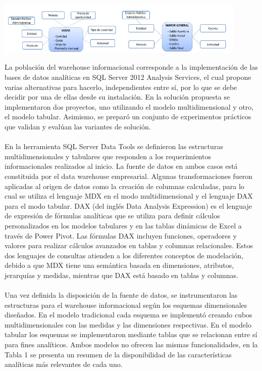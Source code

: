 \documentclass[preprint,12pt]{elsarticle}
\begin{document}
\begin{center}
	\includegraphics[width=12cm]{./Imagenes/ang3} 
\end{center}

La  población  del  warehouse  informacional  corresponde  a  la  implementación  de  las  bases  de  datos analíticas  en  SQL  Server  2012  Analysis  Services,  el  cual  propone  varias  alternativas  para  hacerlo, independientes entre sí, por lo que se debe decidir por una de ellas desde su instalación. En la solución propuesta se implementaron dos proyectos, uno utilizando el modelo multidimensional y otro, el modelo tabular. Asimismo, se preparó un conjunto de experimentos prácticos que validan y evalúan las variantes de solución.  \\ 
\\
En la herramienta SQL Server Data Tools se definieron las estructuras multidimensionales y tabulares que responden a los requerimientos informacionales realizados al inicio. La fuente de datos en ambos casos está constituida por el data warehouse empresarial. Algunas transformaciones fueron aplicadas al origen de datos como la creación de columnas calculadas, para lo cual se utiliza el lenguaje MDX en el modo multidimensional y el lenguaje DAX para el modo tabular. DAX (del inglés Data Analysis Expression) es el lenguaje de expresión de fórmulas analíticas que se utiliza para definir cálculos personalizados en los modelos  tabulares  y en  las  tablas  dinámicas de  Excel  a  través de  Power  Pivot.  Las  fórmulas  DAX incluyen  funciones,  operadores  y  valores  para  realizar  cálculos  avanzados  en  tablas  y  columnas relacionales. Estos dos lenguajes de consultas atienden a los diferentes conceptos de modelación, debido a que MDX tiene una semántica basada en dimensiones, atributos, jerarquías y medidas, mientras que DAX está basado en tablas y columnas.   \\
\\
Una vez definida la disposición de la fuente de datos, se instrumentaron las estructuras para el warehouse informacional según los esquemas dimensionales diseñados. En el modelo tradicional cada esquema se implementó  creando  cubos  multidimensionales  con las  medidas  y  las dimensiones  respectivas.  En  el modelo  tabular los  esquemas  se implementaron  mediante tablas  que  se relacionan  entre  sí para  fines analíticos. Ambos modelos no ofrecen las mismas funcionalidades, en la Tabla 1 se presenta un resumen de la disponibilidad de las características analíticas más relevantes de cada uno.
\end{document}
